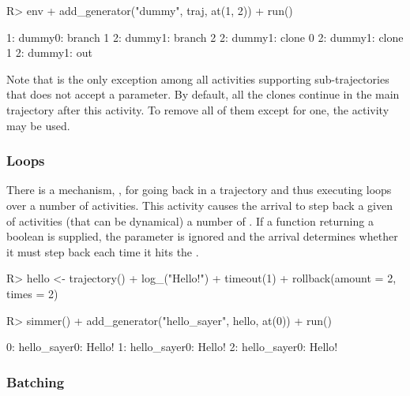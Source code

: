 \documentclass[
  nojss]{jss}
\begin{document}
\begin{CodeChunk}
\begin{CodeInput}
R> env %
+   add_generator("dummy", traj, at(1, 2)) %
+   run() %
\end{CodeInput}
\begin{CodeOutput}
1: dummy0: branch 1
2: dummy1: branch 2
2: dummy1: clone 0
2: dummy1: clone 1
2: dummy1: out
\end{CodeOutput}
\end{CodeChunk}

Note that  is the only exception among all activities
supporting sub-trajectories that does not accept a 
parameter. By default, all the clones continue in the main trajectory
after this activity. To remove all of them except for one, the
 activity may be used.

\hypertarget{loops}{%
\subsubsection{Loops}\label{loops}}

There is a mechanism, , for going back in a trajectory
and thus executing loops over a number of activities. This activity
causes the arrival to step back a given  of activities
(that can be dynamical) a number of . If a 
function returning a boolean is supplied, the  parameter is
ignored and the arrival determines whether it must step back each time
it hits the .

\begin{CodeChunk}
\begin{CodeInput}
R> hello <- trajectory() %
+   log_("Hello!") %
+   timeout(1) %
+   rollback(amount = 2, times = 2)
\end{CodeInput}
\end{CodeChunk}

\begin{CodeChunk}
\begin{CodeInput}
R> simmer() %
+   add_generator("hello_sayer", hello, at(0)) %
+   run() %
\end{CodeInput}
\begin{CodeOutput}
0: hello_sayer0: Hello!
1: hello_sayer0: Hello!
2: hello_sayer0: Hello!
\end{CodeOutput}
\end{CodeChunk}

\hypertarget{batching}{%
\subsubsection{Batching}\label{batching}}
\end{document}
